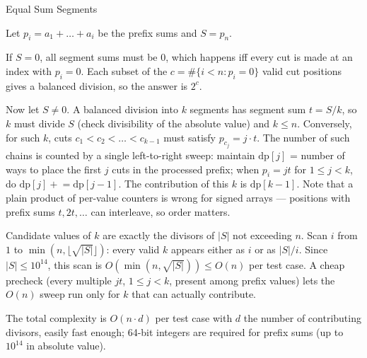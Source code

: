 \begin{tutorial}{Equal Sum Segments}

Let $p_i = a_1 + \dots + a_i$ be the prefix sums and $S = p_n$.

If $S = 0$, all segment sums must be $0$, which happens iff every cut is made at an index with $p_i = 0$. Each subset of the $c = \#\{i < n : p_i = 0\}$ valid cut positions gives a balanced division, so the answer is $2^c$.

Now let $S \neq 0$. A balanced division into $k$ segments has segment sum $t = S / k$, so $k$ must divide $S$ (check divisibility of the absolute value) and $k \le n$. Conversely, for such $k$, cuts $c_1 < c_2 < \dots < c_{k-1}$ must satisfy $p_{c_j} = j \cdot t$. The number of such chains is counted by a single left-to-right sweep: maintain $\text{dp}[j]$ = number of ways to place the first $j$ cuts in the processed prefix; when $p_i = j t$ for $1 \le j < k$, do $\text{dp}[j] \mathrel{+}= \text{dp}[j-1]$. The contribution of this $k$ is $\text{dp}[k-1]$. Note that a plain product of per-value counters is wrong for signed arrays --- positions with prefix sums $t, 2t, \ldots$ can interleave, so order matters.

Candidate values of $k$ are exactly the divisors of $|S|$ not exceeding $n$. Scan $i$ from $1$ to $\min(n, \lfloor\sqrt{|S|}\rfloor)$: every valid $k$ appears either as $i$ or as $|S|/i$. Since $|S| \le 10^{14}$, this scan is $O(\min(n, \sqrt{|S|})) \le O(n)$ per test case. A cheap precheck (every multiple $j t$, $1 \le j < k$, present among prefix values) lets the $O(n)$ sweep run only for $k$ that can actually contribute.

The total complexity is $O(n \cdot d)$ per test case with $d$ the number of contributing divisors, easily fast enough; 64-bit integers are required for prefix sums (up to $10^{14}$ in absolute value).


\end{tutorial}
